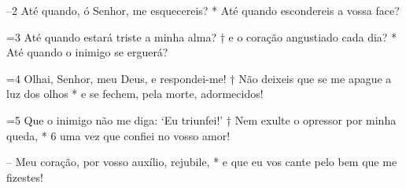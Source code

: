 –2 Até quando, ó Senhor, me esquecereis? * 
Até quando escondereis a vossa face? 

=3 Até quando estará triste a minha alma? † 
e o coração angustiado cada dia? * 
Até quando o inimigo se erguerá? 

=4 Olhai, Senhor, meu Deus, e respondei-me! † 
Não deixeis que se me apague a luz dos olhos * 
e se fechem, pela morte, adormecidos! 

=5 Que o inimigo não me diga: ‘Eu triunfei!’ † 
Nem exulte o opressor por minha queda, * 
6 uma vez que confiei no vosso amor! 

– Meu coração, por vosso auxílio, rejubile, * 
e que eu vos cante pelo bem que me fizestes!